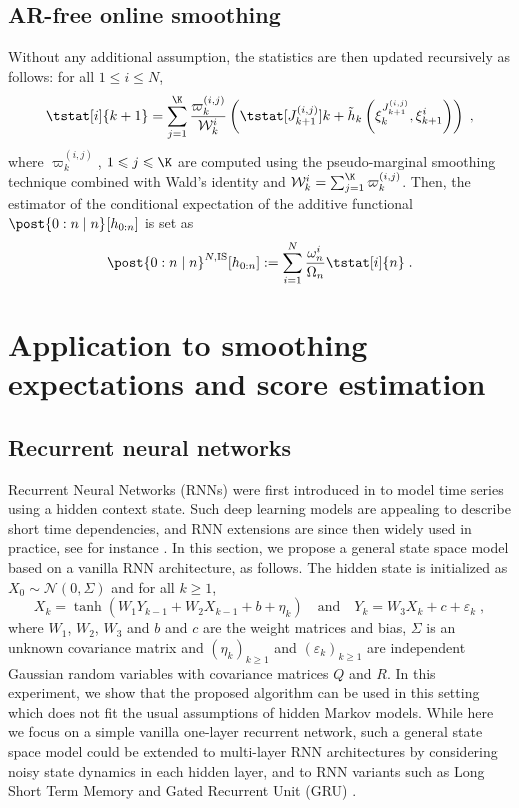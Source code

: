 \documentclass[12pt]{article}
\newcommand{\af}[1]{h_{#1}}
\newcommand{\addf}[1]{\termletter_{#1}}
\newcommand{\termletter}{\tilde{h}}
\newcommand{\N}{N}
\newcommand{\bi}[3]{J_{#1}^{(#2, #3)}}
\newcommand{\eqdef}{\ensuremath{:=}}
\newcommand{\eqsp}{\;}
\newcommand{\ewght}[2]{\ensuremath{\omega_{#1}^{#2}}}
\newcommand{\epart}[2]{\ensuremath{\xi_{#1}^{#2}}}
\newcommand{\sumwght}[2][]{%
\ifthenelse{\equal{#1}{}}{\ensuremath{\Omega_{#2}}}{\ensuremath{\Omega_{#2}^{(#1)}}}}
\begin{document}
\subsection{AR-free online smoothing}
Without any additional assumption, the statistics are then updated recursively as follows: for all $1\leqslant i\leqslant \N$,
\begin{equation}
\label{eq:update:paris:marginal:is}
\tstat[i]{k+1} =\sum_{j=1}^{\K}\frac{\varpi_k^{(i,j)}}{\mathcal{W}_k^i}\left( \tstat[\bi{k+1}{i}{j}]{k} + \addf{k}\left(\epart{k}{\bi{k+1}{i}{j}}, \epart{k+1}{i}\right)\right)\eqsp,
\end{equation}
where $\varpi_k^{(i,j)}$, $1\leqslant j \leqslant \K$ are computed using the pseudo-marginal smoothing technique combined with Wald's identity and $\mathcal{W}_k^i = \sum_{j=1}^{\K} \varpi_k^{(i,j)}$. 
Then, the estimator of the conditional expectation of the additive functional $\post{0:n\mid n}^{} [\af{0:n}]$ is set as
\[
\post{0:n\mid n}^{\N,\textrm{IS}} [\af{0:n}] \eqdef \sum_{i=1}^{\N}\frac{\ewght{n}{i}}{\sumwght{n}}\tstat[i]{n}\eqsp.
\]

\section{Application to smoothing expectations and score estimation}
\label{sec:application}

\subsection{Recurrent neural networks}
\label{sec:simu:RNN}


Recurrent Neural Networks (RNNs) were first introduced in \cite{Mozer1989AFB} to model time series using a hidden context state. Such deep learning models are appealing to describe short time dependencies, and RNN extensions \citep{Hochreiter1997LongSM, Cho2014LearningPR} are since then widely used in practice, see for instance \cite{mikolov2010recurrent, sutskever2011generating, sutskever2014sequence}.
 In this section, we propose a general state space model based on a vanilla RNN architecture, as follows.  
 The hidden state is initialized as $X_0 \sim \mathcal{N}(0,\Sigma)$ and for all $k\geqslant 1$,
$$
X_k = \tanh(W_{1} Y_{k-1} + W_{2} X_{k-1} + b + \eta_k)\quad\mathrm{and} \quad Y_k = W_{3} X_{k}  + c + \varepsilon_k\eqsp,
$$
where $W_{1}$, $W_{2}$, $W_3$ and $b$ and $c$ are the weight matrices and bias,  $\Sigma$ is an unknown covariance matrix and $(\eta_k)_{k\geqslant 1}$ and $(\varepsilon_k)_{k\geqslant 1}$ are independent Gaussian random variables with covariance matrices $Q$ and $R$.
In this experiment,  we show that the proposed algorithm can be used in this setting which does not fit the usual assumptions of hidden Markov models. %
While here we focus on a simple vanilla one-layer recurrent network, such a general state space model could be extended to multi-layer RNN architectures by considering noisy state dynamics in each hidden layer, and to RNN variants such as Long Short Term Memory  \citep{Hochreiter1997LongSM} and Gated Recurrent Unit (GRU) \citep{Cho2014LearningPR}.
 
\end{document}
